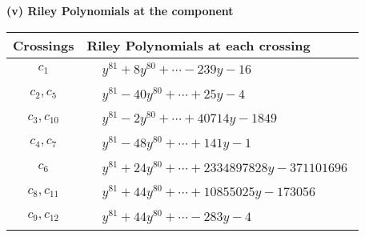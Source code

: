 \documentclass[1p]{elsarticle_modified}
\theoremstyle{definition}
\begin{document}
\flushleft \textbf{(v) Riley Polynomials at the component}\newline \\
\begin{tabular}{m{50pt}|m{274pt}}
Crossings & \hspace{64pt}Riley Polynomials at each crossing \\
\hline $$\begin{aligned}c_{1}\end{aligned}$$&$\begin{aligned}
&y^{81}+8 y^{80}+\cdots-239 y-16
\end{aligned}$\\
\hline $$\begin{aligned}c_{2},c_{5}\end{aligned}$$&$\begin{aligned}
&y^{81}-40 y^{80}+\cdots+25 y-4
\end{aligned}$\\
\hline $$\begin{aligned}c_{3},c_{10}\end{aligned}$$&$\begin{aligned}
&y^{81}-2 y^{80}+\cdots+40714 y-1849
\end{aligned}$\\
\hline $$\begin{aligned}c_{4},c_{7}\end{aligned}$$&$\begin{aligned}
&y^{81}-48 y^{80}+\cdots+141 y-1
\end{aligned}$\\
\hline $$\begin{aligned}c_{6}\end{aligned}$$&$\begin{aligned}
&y^{81}+24 y^{80}+\cdots+2334897828 y-371101696
\end{aligned}$\\
\hline $$\begin{aligned}c_{8},c_{11}\end{aligned}$$&$\begin{aligned}
&y^{81}+44 y^{80}+\cdots+10855025 y-173056
\end{aligned}$\\
\hline $$\begin{aligned}c_{9},c_{12}\end{aligned}$$&$\begin{aligned}
&y^{81}+44 y^{80}+\cdots-283 y-4
\end{aligned}$\\
\hline
\end{tabular}\\~\\
\end{document}
